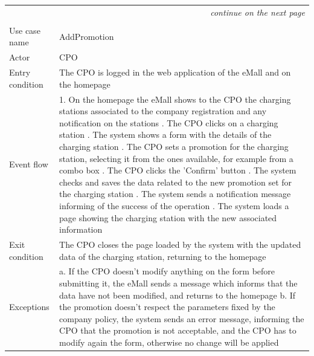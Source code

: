 \begin{center}
    \begin{longtable}{p{4cm} p{11cm}}
    \multicolumn{2}{r}{\itshape{continue on the next page}}\\
    \endfoot 
    \\
    \endlastfoot
    \hline
     Use case name &  AddPromotion\\
     \hline
     Actor & CPO \\
     \hline
     Entry condition & The CPO is logged in the web application of the eMall and on the homepage \\
     \hline
     Event flow &   1. On the homepage the eMall shows to the CPO the charging stations associated                 to the company registration and any notification on the stations \newline
                    2. The CPO clicks on a charging station \newline 
                    3. The system shows a form with the details of the charging station \newline
                    4. The CPO sets a promotion for the charging station, selecting it from the ones available, for example from a combo box \newline
                    5. The CPO clicks the 'Confirm' button \newline
                    6. The system checks and saves the data related to the new promotion set for the charging station \newline
                    7. The system sends a notification message informing of the success of the operation \newline
                    8. The system loads a page showing the charging station with the new associated information\\
     \hline
     Exit condition &  The CPO closes the page loaded by the system with the updated data of the charging station, returning to the homepage \\
     \hline
     Exceptions &   a. If the CPO doesn't modify anything on the form before submitting it, the                     eMall sends a message which informs that the data have not been modified, and                  returns to the homepage \newline
                    b. If the promotion doesn't respect the parameters fixed by the company policy, the system sends an error message, informing the CPO that the promotion is not acceptable, and the CPO has to modify again the form, otherwise no change will be applied \newline

\end{longtable}
\end{center}
